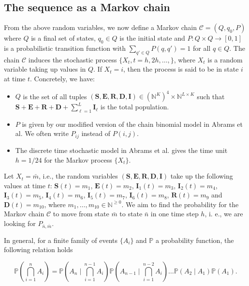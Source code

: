 \documentclass[a4paper]{article}
\renewcommand{\vec}[1]{\boldsymbol{#1}}
\theoremstyle{remark}
\begin{document}
\subsection{The sequence as a Markov chain}
From the above random variables, we now define a Markov chain $\mathcal{C} = (Q,q_0,P)$ where $Q$ is a final set of states, $q_0 \in Q$ is the initial state and $P \colon Q \times Q \to [0,1]$ is a probabilistic transition function with $\sum_{q' \in Q} P(q,q') = 1$ for all $q \in Q$. The chain $\mathcal{C}$ induces the stochastic process $\{X_{t},t=h,2h,\ldots,\}$, where $X_{t}$ is a random variable taking up values in $Q$. If $X_{t}=i$, then the process is said to be in state $i$ at time $t$. Concretely, we have:
\begin{itemize}
    \item $Q$ is the set of all tuples $(\vec{S},\vec{E},\vec{R},\vec{D},\vec{I}) \in (\mathbb{N}^K)^4 \times \mathbb{N}^{L \times K}$ such that $\vec{S} + \vec{E} + \vec{R} + \vec{D} + \sum_{\ell = 1}^L \vec{I}_\ell$ is the total population.
    
    \item $P$ is given by our modified version of the chain binomial model in Abrams et al. We often write $P_{ij}$ instead of $P(i,j)$.
    
    \item The discrete time stochastic model in Abrams et al. gives the time unit $h=1/24$ for the Markov process $\{X_{t}\}$. 
\end{itemize}

\medskip
Let $X_{t}=\bar{m}$, i.e., the random variables $(\vec{S},\vec{E},\vec{R},\vec{D},\vec{I})$ take up the following values at time $t$: $\vec{S}(t) =  m_1$, $\vec{E}(t) =  m_2$, $\vec{I}_1(t) = m_3$, $\vec{I}_2(t) = m_4$, $\vec{I}_3(t) = m_5$, $\vec{I}_4(t) = m_6$, $\vec{I}_5(t) = m_7$, $\vec{I}_6(t) = m_8$, $\vec{R}(t) = m_9$ and $\vec{D}(t) = m_{10}$, where $m_1,\ldots,m_{10}\in \mathbb{N}^{\geq 0}$. We aim to find the probability for the Markov chain $\mathcal{C}$ to move from state $\bar{m}$ to state $\bar{n}$ in one time step $h$, i. e., we are looking for $P_{\bar{n},\bar{m}}$. 


\medskip
In general, for a finite family of events $\{A_i\}$ and $\mathbb{P}$ a probability function, the following relation holds

\begin{equation}
    \label{eq:intersection}   
    \mathbb{P}\left( \bigcap_{i=1}^{n}A_{i}\right)=\mathbb{P}\left(A_n\mid \bigcap_{i=1}^{n-1}A_{i}\right)\mathbb{P}\left(A_{n-1}\mid \bigcap_{i=1}^{n-2}A_{i}\right)\ldots \mathbb{P}\left(A_2\mid A_{1}\right)\mathbb{P}\left(A_{1}\right). 
\end{equation}
\end{document}
